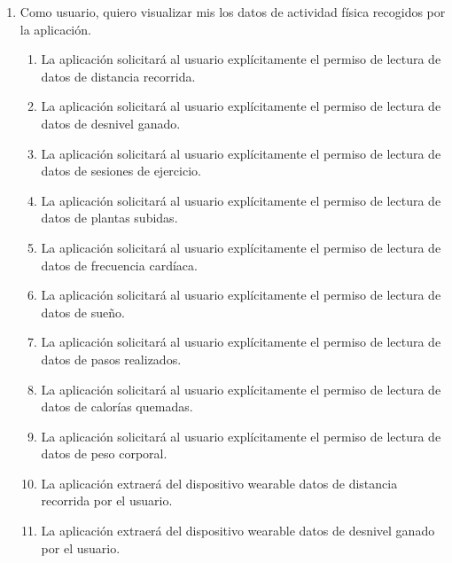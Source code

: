         \begin{enumerate}[resume=req-usuario,label=\textbf{\texttt{RU-\arabic*}}]
            \item \label{req:usuario:visualizar_actividad_fisica} Como usuario, quiero visualizar mis los datos de actividad física recogidos por la aplicación.
            \begin{enumerate}[resume=req-funcionales,label=\textbf{\texttt{RF-\arabic*}}]
                \item \label{req:funcionales:permiso_distancia} La aplicación solicitará al usuario explícitamente el permiso de lectura de datos de distancia recorrida.
                \item \label{req:funcionales:permiso_desnivel} La aplicación solicitará al usuario explícitamente el permiso de lectura de datos de desnivel ganado.
                \item \label{req:funcionales:permiso_ejercicio} La aplicación solicitará al usuario explícitamente el permiso de lectura de datos de sesiones de ejercicio.
                \item \label{req:funcionales:permiso_plantas} La aplicación solicitará al usuario explícitamente el permiso de lectura de datos de plantas subidas.
                \item \label{req:funcionales:permiso_pulsaciones} La aplicación solicitará al usuario explícitamente el permiso de lectura de datos de frecuencia cardíaca.
                \item \label{req:funcionales:permiso_sueno} La aplicación solicitará al usuario explícitamente el permiso de lectura de datos de sueño.
                \item \label{req:funcionales:permiso_pasos} La aplicación solicitará al usuario explícitamente el permiso de lectura de datos de pasos realizados.
                \item \label{req:funcionales:permiso_calorias} La aplicación solicitará al usuario explícitamente el permiso de lectura de datos de calorías quemadas.
                \item \label{req:funcionales:permiso_peso} La aplicación solicitará al usuario explícitamente el permiso de lectura de datos de peso corporal.
                \item \label{req:funcionales:extraer_distancia} La aplicación extraerá del dispositivo \gls{wearable} datos de distancia recorrida por el usuario.
                \item \label{req:funcionales:extraer_desnivel} La aplicación extraerá del dispositivo \gls{wearable} datos de desnivel ganado por el usuario.

\end{enumerate}
\end{enumerate}
